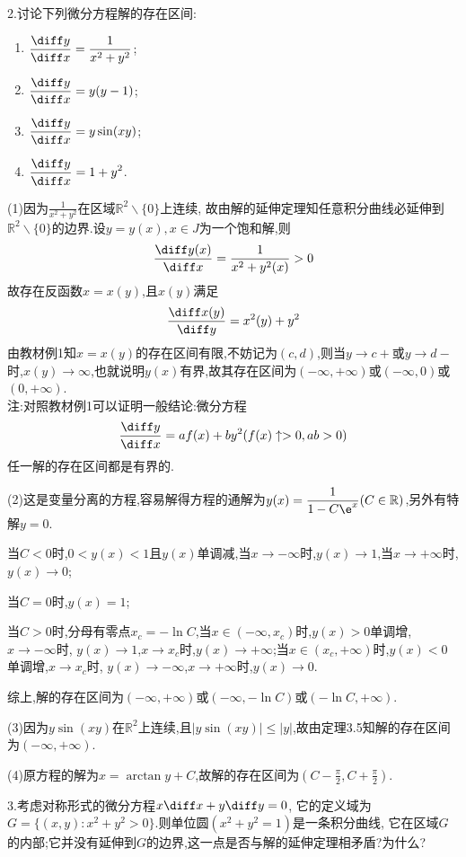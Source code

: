 2.讨论下列微分方程解的存在区间:
\begin{enumerate}[(1)]
\item $\displaystyle\frac{\diff y}{\diff x}=\frac{1}{x^2+y^2}$;
\item $\displaystyle\frac{\diff y}{\diff x}=y(y-1)$;
\item $\displaystyle\frac{\diff y}{\diff x}=y\sin(xy)$;
\item $\displaystyle\frac{\diff y}{\diff x}=1+y^2$.
\end{enumerate}

\begin{solve}
(1)因为$\frac{1}{x^2+y^2}$在区域$\mathbb{R}^2\backslash\{0\}$上连续,
故由解的延伸定理知任意积分曲线必延伸到$\mathbb{R}^2\backslash\{0\}$的边界.设$y=y(x),x\in J$为一个饱和解,则
\[\frac{\diff y(x)}{\diff x}=\frac{1}{x^2+y^2(x)}>0\]
故存在反函数$x=x(y)$,且$x(y)$满足
\[\frac{\diff x(y)}{\diff y}=x^2(y)+y^2\]
由教材例1知$x=x(y)$的存在区间有限,不妨记为$(c,d)$,则当$y\to c+$或$y\to d-$时,$x(y)\to\infty$,也就说明$y(x)$有界,故其存在区间为$(-\infty,+\infty)$或$(-\infty,0)$或$(0,+\infty)$.\\
注:对照教材例1可以证明一般结论:微分方程
\[\frac{\diff y}{\diff x}=af(x)+by^2(f(x)\uparrow>0,ab>0)\]
任一解的存在区间都是有界的.

(2)这是变量分离的方程,容易解得方程的通解为$\displaystyle y(x)=\frac{1}{1-C\e^x}(C\in\mathbb{R})$,另外有特解$y=0$.

当$C<0$时,$0<y(x)<1$且$y(x)$单调减,当$x\to-\infty$时,$y(x)\to1$,当$x\to+\infty$时,$y(x)\to0$;

当$C=0$时,$y(x)=1$;

当$C>0$时,分母有零点$x_c=-\ln C$,当$x\in(-\infty,x_c)$时,$y(x)>0$单调增,$x\to-\infty$时,
$y(x)\to1$,$x\to x_c$时,$y(x)\to+\infty$;当$x\in(x_c,+\infty)$时,$y(x)<0$单调增,$x\to x_c$时,
$y(x)\to-\infty$,$x\to+\infty$时,$y(x)\to0$.

综上,解的存在区间为$(-\infty,+\infty)$或$(-\infty,-\ln C)$或$(-\ln C,+\infty)$.

(3)因为$y\sin(xy)$在$\mathbb{R}^2$上连续,且$|y\sin(xy)|\leq|y|$,故由定理3.5知解的存在区间为$(-\infty,+\infty)$.

(4)原方程的解为$x=\arctan y+C$,故解的存在区间为$(C-\frac{\pi}{2},C+\frac{\pi}{2})$.
\end{solve}


3.考虑对称形式的微分方程$x\diff x+y\diff y=0$,
它的定义域为$G=\{(x,y):x^2+y^2>0\}$.则单位圆$(x^2+y^2=1)$是一条积分曲线,
它在区域$G$的内部;它并没有延伸到$G$的边界,这一点是否与解的延伸定理相矛盾?为什么?

